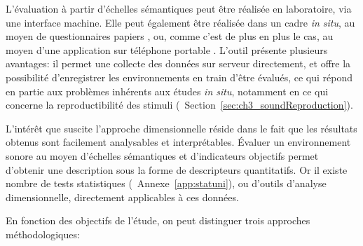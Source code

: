 L'évaluation à partir d'échelles sémantiques peut être réalisée en laboratoire, via une interface machine. Elle peut également être réalisée dans un cadre \emph{in situ}, au moyen de questionnaires papiers \citep{jeon2013soundwalk,torija2013application}, ou, comme c'est de plus en plus le cas, au moyen d'une application sur téléphone portable \citep{kardous2014evaluation,ricciardi2015sound}. L'outil présente plusieurs avantages: il permet une collecte des données sur serveur directement, et offre la possibilité d'enregistrer les environnements en train d'être évalués, ce qui répond en partie aux problèmes inhérents aux études \emph{in situ}, notamment en ce qui concerne la reproductibilité des stimuli (\cf~Section~\ref{sec:ch3_soundReproduction}).

L'intérêt que suscite l'approche dimensionnelle réside dans le fait que les résultats obtenus sont facilement analysables et interprétables. Évaluer un environnement sonore au moyen d'échelles sémantiques et d'indicateurs objectifs permet d'obtenir une description sous la forme de descripteurs quantitatifs. Or il existe nombre de tests statistiques (\cf~Annexe~\ref{app:statuni}), ou d'outils d'analyse dimensionnelle, directement applicables à ces données.

En fonction des objectifs de l'étude, on peut distinguer trois approches méthodologiques:

